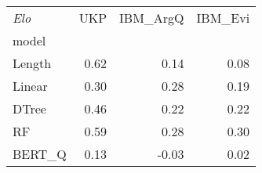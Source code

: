 \begin{tabular}{lrrr}
\toprule
\textit{Elo} &   UKP &  IBM\_ArgQ &  IBM\_Evi \\
model  &       &           &          \\
\midrule
Length &  0.62 &      0.14 &     0.08 \\
Linear &  0.30 &      0.28 &     0.19 \\
DTree  &  0.46 &      0.22 &     0.22 \\
RF     &  0.59 &      0.28 &     0.30 \\
BERT\_Q &  0.13 &     -0.03 &     0.02 \\
\bottomrule
\end{tabular}
